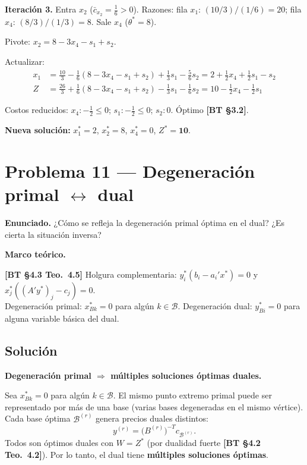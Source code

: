 \documentclass{article}
\newenvironment{marco}{\begin{mdframed}[linecolor=black!40,backgroundcolor=gray!5]\small\textbf{Marco teórico.}\par\smallskip}{\end{mdframed}\medskip}
\begin{document}
\begin{enumerate}[a)]
\medskip
\textbf{Iteración 3.} Entra $x_2$ ($\bar{c}_{x_2} = \tfrac{1}{6} > 0$). Razones: fila $x_1$: $(10/3)/(1/6)=20$; fila $x_4$: $(8/3)/(1/3)=8$. Sale $x_4$ ($\theta^* = 8$).

Pivote: $x_2 = 8 - 3x_4 - s_1 + s_2$.

Actualizar:
\begin{align*}
x_1 &= \tfrac{10}{3} - \tfrac{1}{6}(8-3x_4-s_1+s_2) + \tfrac{1}{3}s_1 - \tfrac{5}{6}s_2 = 2 + \tfrac{1}{2}x_4 + \tfrac{1}{2}s_1 - s_2 \\
Z   &= \tfrac{26}{3} + \tfrac{1}{6}(8-3x_4-s_1+s_2) - \tfrac{1}{3}s_1 - \tfrac{1}{6}s_2 = 10 - \tfrac{1}{2}x_4 - \tfrac{1}{2}s_1
\end{align*}

Costos reducidos: $x_4: -\tfrac{1}{2}\leq 0$; $s_1: -\tfrac{1}{2}\leq 0$; $s_2: 0$. Óptimo \textbf{[BT §3.2]}.

\textbf{Nueva solución:} $x_1^* = 2$, $x_2^* = 8$, $x_4^* = 0$, $Z^* = \mathbf{10}$.

\end{enumerate}

\section*{Problema 11 --- Degeneración primal $\leftrightarrow$ dual}

\textbf{Enunciado.} ¿Cómo se refleja la degeneración primal óptima en el dual? ¿Es cierta la situación inversa?

\begin{marco}
\textbf{[BT §4.3 Teo.\ 4.5]} Holgura complementaria: $y_i^*(b_i - a_i'x^*) = 0$ y $x_j^*((A'y^*)_j - c_j) = 0$. \\[2pt]
Degeneración primal: $x_{Bk}^* = 0$ para algún $k \in \mathcal{B}$. Degeneración dual: $y_{Bi}^* = 0$ para alguna variable básica del dual.
\end{marco}

\subsection*{Solución}

\textbf{Degeneración primal $\Rightarrow$ múltiples soluciones óptimas duales.}

Sea $x_{Bk}^* = 0$ para algún $k \in \mathcal{B}$. El mismo punto extremo primal puede ser representado por más de una base (varias bases degeneradas en el mismo vértice). Cada base óptima $\mathcal{B}^{(r)}$ genera precios duales distintos:
\[
  y^{(r)} = \bigl(B^{(r)}\bigr)^{-T} c_{\mathcal{B}^{(r)}}.
\]
Todos son óptimos duales con $W = Z^*$ (por dualidad fuerte \textbf{[BT §4.2 Teo.\ 4.2]}). Por lo tanto, el dual tiene \textbf{múltiples soluciones óptimas}.
\end{document}
